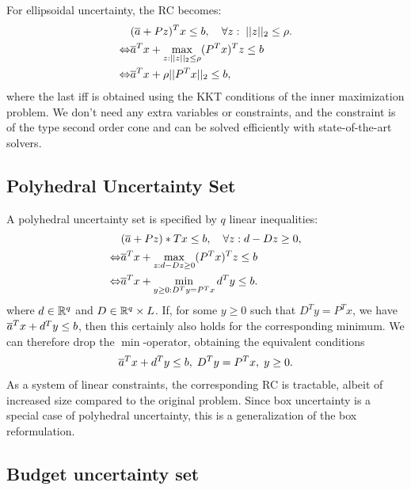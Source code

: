For ellipsoidal uncertainty, the RC becomes:
\begin{align*}
& (\overline{ a }+Pz)^Tx \leq b,\quad\forall z:\;\vert\vert z \vert\vert_2\leq\rho.\\
\Leftrightarrow & \overline{ a }^Tx + \max\limits_{z:\vert\vert z \vert\vert_2\leq\rho} (P^Tx)^Tz \leq b\\
\Leftrightarrow & \overline{ a }^Tx+\rho\vert\vert P^Tx \vert\vert_2\leq b,
\end{align*}
where the last iff is obtained using the KKT conditions of the inner maximization problem. We don't need any extra variables or constraints, and the constraint is of the type second order cone and can be solved efficiently with state-of-the-art solvers.

\subsection{Polyhedral Uncertainty Set}

A polyhedral uncertainty set is specified by $q$ linear inequalities:
\begin{align*}
& (\overline{ a }+Pz)*Tx\leq b, \quad\forall z: d-Dz\geq 0, \\
\Leftrightarrow & \overline{ a }^Tx + \max\limits_{z:d-Dz\geq 0} (P^Tx)^Tz\leq b \\
\Leftrightarrow & \overline{ a }^Tx + \min\limits_{y\geq 0:D^Ty=P^Tx} d^Ty \leq b.
\end{align*}
where $d\in\mathbb{R}^q$ and $D\in\mathbb{R}^q\times L$. If, for some $y\geq0$ such that $D^Ty = P^Tx$, we have $\overline{ a }^Tx+d^Ty\leq b$, then this certainly also holds for the corresponding minimum. We can therefore drop the $\min$-operator, obtaining the equivalent conditions  
\begin{align*}
 \overline{ a }^Tx + d^Ty \leq b,\;D^Ty=P^Tx,\;y\geq 0.
\end{align*}
As a system of linear constraints, the corresponding RC is tractable, albeit of increased size compared to the original problem. Since box uncertainty is a special case of polyhedral uncertainty, this is a generalization of the box reformulation.

\subsection{Budget uncertainty set}

